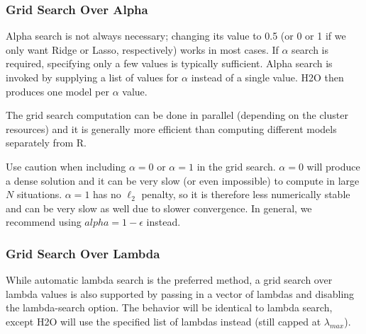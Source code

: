 \waterExampleInR


\waterExampleInPython


\subsubsection{Grid Search Over Alpha}

Alpha search is not always necessary; changing its value to 0.5 (or 0 or 1 if we only want Ridge or Lasso,
respectively) works in most cases. If $\alpha$ search is required, specifying only a few values is typically sufficient. Alpha
search is invoked by supplying a list of values for $\alpha$ instead of a single value. H2O then produces one model
per $\alpha$ value. 

The grid search computation can be done in parallel (depending on the cluster resources) and it
is generally more efficient than computing different models separately from R.

Use caution when including $\alpha=0$ or $\alpha=1$ in the grid search. $\alpha=0$ will produce a dense solution
and it can be very slow (or even impossible) to compute in large $N$ situations. $\alpha=1$ has no  $\ell_2$ penalty, so
it is therefore less numerically stable and can be very slow as well due to slower convergence. In general, we recommend using $alpha=1-\epsilon$ instead.

\waterExampleInR


\newpage
\waterExampleInPython


\subsubsection{Grid Search Over Lambda}

 While automatic lambda search is the preferred method,  a grid search over lambda values is also supported
 by passing in a vector of lambdas and disabling the lambda-search option. The behavior will be identical to lambda
 search, except H2O will use the specified list of lambdas instead (still capped at $\lambda_{max}$).

\waterExampleInR


